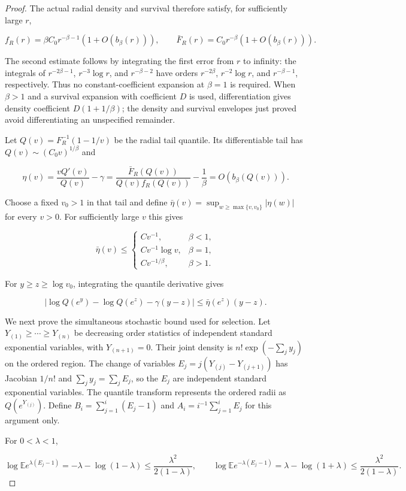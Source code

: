 \documentclass[12pt]{article}
\theoremstyle{plain}
\theoremstyle{definition}
\begin{document}
\begin{proof}
The actual radial density and survival therefore satisfy, for sufficiently large $r$,

\[
f_R(r)=\beta C_0r^{-\beta-1}(1+O(b_\beta(r))),\qquad
\bar F_R(r)=C_0r^{-\beta}(1+O(b_\beta(r))).
\]

The second estimate follows by integrating the first error from $r$ to infinity: the integrals of $r^{-2\beta-1}$, $r^{-3}\log r$, and $r^{-\beta-2}$ have orders $r^{-2\beta}$, $r^{-2}\log r$, and $r^{-\beta-1}$, respectively. Thus no constant-coefficient expansion at $\beta=1$ is required. When $\beta>1$ and a survival expansion with coefficient $D$ is used, differentiation gives density coefficient $D(1+1/\beta)$; the density and survival envelopes just proved avoid differentiating an unspecified remainder. 

Let $Q(v)=F_R^{-1}(1-1/v)$ be the radial tail quantile. Its differentiable tail has $Q(v)\sim(C_0v)^{1/\beta}$ and

\[
\eta(v)=\frac{vQ'(v)}{Q(v)}-\gamma
=\frac{\bar F_R(Q(v))}{Q(v)f_R(Q(v))}-\frac1\beta
=O(b_\beta(Q(v))).
\]

Choose a fixed $v_0>1$ in that tail and define $\bar\eta(v)=\sup_{w\geq\max\{v,v_0\}}|\eta(w)|$ for every $v>0$. For sufficiently large $v$ this gives

\[
\bar\eta(v)\leq
\begin{cases}Cv^{-1},&\beta<1,\\Cv^{-1}\log v,&\beta=1,\\Cv^{-1/\beta},&\beta>1.\end{cases}
\]

For $y\geq z\geq\log v_0$, integrating the quantile derivative gives

\[
|\log Q(e^y)-\log Q(e^z)-\gamma(y-z)|\leq\bar\eta(e^z)(y-z).
\]
 

We next prove the simultaneous stochastic bound used for selection. Let $Y_{(1)}\geq\cdots\geq Y_{(n)}$ be decreasing order statistics of independent standard exponential variables, with $Y_{(n+1)}=0$. Their joint density is $n!\exp(-\sum_j y_j)$ on the ordered region. The change of variables $E_j=j(Y_{(j)}-Y_{(j+1)})$ has Jacobian $1/n!$ and $\sum_j y_j=\sum_j E_j$, so the $E_j$ are independent standard exponential variables. The quantile transform represents the ordered radii as $Q(e^{Y_{(j)}})$. Define $B_i=\sum_{j=1}^i(E_j-1)$ and $A_i=i^{-1}\sum_{j=1}^iE_j$ for this argument only. 

For $0<\lambda<1$,

\[
\log\mathbb E e^{\lambda(E_j-1)}=-\lambda-\log(1-\lambda)\leq\frac{\lambda^2}{2(1-\lambda)},\qquad
\log\mathbb E e^{-\lambda(E_j-1)}=\lambda-\log(1+\lambda)\leq\frac{\lambda^2}{2(1-\lambda)}.
\]


\end{proof}
\end{document}
